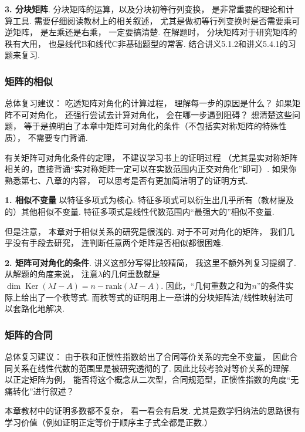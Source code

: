 \medskip

\textbf{3. 分块矩阵}.
分块矩阵的运算，以及分块初等行列变换，
是非常重要的理论和计算工具.
需要仔细阅读教材上的相关叙述，
尤其是做初等行列变换时是否需要乘可逆矩阵，
是左乘还是右乘，
一定要搞清楚.
在解题时，
分块矩阵对于研究矩阵的秩有大用，
也是线代B和线代C非基础题型的常客.
结合讲义5.1.2和讲义5.4.1的习题来复习.

\subsubsection{矩阵的相似}

总体复习建议：
吃透矩阵对角化的计算过程，
理解每一步的原因是什么？
如果矩阵不可对角化，
还强行尝试去计算对角化，
会在哪一步遇到阻碍？
想清楚这些问题，
等于是搞明白了本章中矩阵可对角化的条件（不包括实对称矩阵的特殊性质），
不需要专门背诵.

有关矩阵可对角化条件的定理，
不建议学习书上的证明过程
（尤其是实对称矩阵相关的，直接背诵“实对称矩阵一定可以在实数范围内正交对角化”即可）.
如果你熟悉第七、八章的内容，
可以思考是否有更加简洁明了的证明方式.

\medskip

\textbf{1. 相似不变量}
以特征多项式为核心.
特征多项式可以衍生出几乎所有（教材提及的）其他相似不变量.
特征多项式是线性代数范围内“最强大的”相似不变量.

但是注意，
本章对于相似关系的研究是很浅的.
对于不可对角化的矩阵，
我们几乎没有手段去研究，
连判断任意两个矩阵是否相似都很困难.

\medskip

\textbf{2. 矩阵可对角化的条件}.
讲义这部分写得比较精简，
我这里不额外列复习提纲了.
从解题的角度来说，
注意$\lambda$的几何重数就是$\dim \operatorname{Ker}(\lambda I - A) = n - \mathrm{rank}(\lambda I - A)$.
因此，“几何重数之和为$n$”的条件实际上给出了一个秩等式.
而秩等式的证明用上一章讲的分块矩阵法/线性映射法可以套路化地解决.

\subsubsection{矩阵的合同}

总体复习建议：
由于秩和正惯性指数给出了合同等价关系的完全不变量，
因此合同关系在线性代数的范围里是被研究透彻的了.
因此比较考验对等价关系的理解.
以正定矩阵为例，
能否将这个概念从二次型，合同规范型，正惯性指数的角度“无痛转化”进行叙述？

本章教材中的证明多数都不复杂，
看一看会有启发.
尤其是数学归纳法的思路很有学习价值（例如证明正定等价于顺序主子式全都是正数.）


